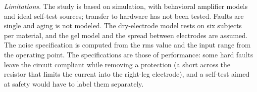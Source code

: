\emph{Limitations.} The study is based on simulation, with behavioral amplifier models and ideal
self-test sources; transfer to hardware has not been tested. Faults are single and aging is not
modeled. The dry-electrode model rests on six subjects per material, and the gel model and the
spread between electrodes are assumed. The noise specification is computed from the rms value
and the input range from the operating point. The specifications are those of performance: some
hard faults leave the circuit compliant while removing a protection (a short across the resistor
that limits the current into the right-leg electrode), and a self-test aimed at safety would
have to label them separately.
